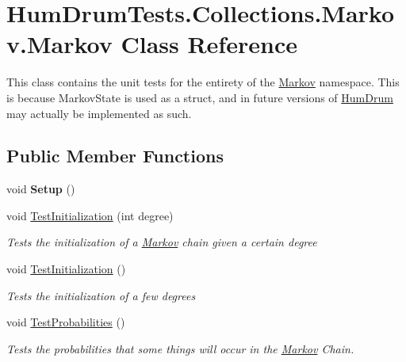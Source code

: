 \hypertarget{classHumDrumTests_1_1Collections_1_1Markov_1_1Markov}{}\section{Hum\+Drum\+Tests.\+Collections.\+Markov.\+Markov Class Reference}
\label{classHumDrumTests_1_1Collections_1_1Markov_1_1Markov}


This class contains the unit tests for the entirety of the \hyperlink{classHumDrumTests_1_1Collections_1_1Markov_1_1Markov}{Markov} namespace. This is because Markov\+State is used as a struct, and in future versions of \hyperlink{namespaceHumDrum}{Hum\+Drum} may actually be implemented as such.  


\subsection*{Public Member Functions}
\begin{DoxyCompactItemize}
\item 
void {\bfseries Setup} ()\hypertarget{classHumDrumTests_1_1Collections_1_1Markov_1_1Markov_a84cfa4f299f032a569531b9a541fc2f2}{}\label{classHumDrumTests_1_1Collections_1_1Markov_1_1Markov_a84cfa4f299f032a569531b9a541fc2f2}

\item 
void \hyperlink{classHumDrumTests_1_1Collections_1_1Markov_1_1Markov_af19a1b51ebd34fe449607616524b737b}{Test\+Initialization} (int degree)
\begin{DoxyCompactList}\small\item\em Tests the initialization of a \hyperlink{classHumDrumTests_1_1Collections_1_1Markov_1_1Markov}{Markov} chain given a certain degree \end{DoxyCompactList}\item 
void \hyperlink{classHumDrumTests_1_1Collections_1_1Markov_1_1Markov_ae1bd8a39206beab40020a71b2293e3a0}{Test\+Initialization} ()
\begin{DoxyCompactList}\small\item\em Tests the initialization of a few degrees \end{DoxyCompactList}\item 
void \hyperlink{classHumDrumTests_1_1Collections_1_1Markov_1_1Markov_ab864cf346f0ef6e2d21ebfe14a06ecff}{Test\+Probabilities} ()
\begin{DoxyCompactList}\small\item\em Tests the probabilities that some things will occur in the \hyperlink{classHumDrumTests_1_1Collections_1_1Markov_1_1Markov}{Markov} Chain. \end{DoxyCompactList}\end{DoxyCompactItemize}



